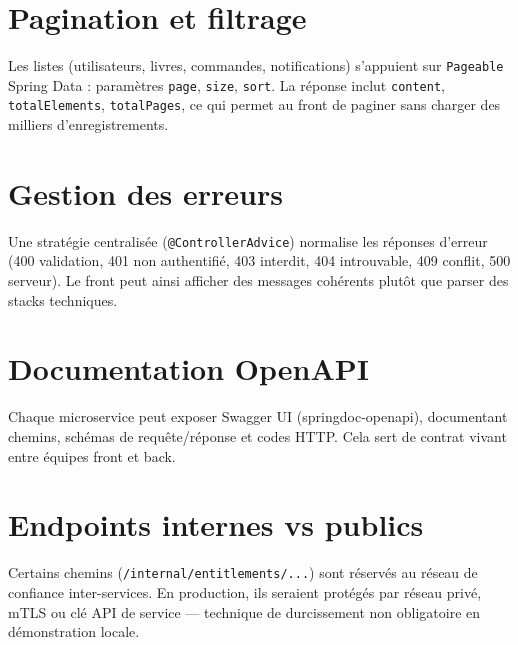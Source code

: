 \documentclass[12pt,a4paper]{report}
\begin{document}
\section{Pagination et filtrage}
Les listes (utilisateurs, livres, commandes, notifications) s'appuient sur \texttt{Pageable} Spring Data : paramètres \texttt{page}, \texttt{size}, \texttt{sort}. La réponse inclut \texttt{content}, \texttt{totalElements}, \texttt{totalPages}, ce qui permet au front de paginer sans charger des milliers d'enregistrements.\par

\section{Gestion des erreurs}
Une stratégie centralisée (\texttt{@ControllerAdvice}) normalise les réponses d'erreur (400 validation, 401 non authentifié, 403 interdit, 404 introuvable, 409 conflit, 500 serveur). Le front peut ainsi afficher des messages cohérents plutôt que parser des stacks techniques.\par

\section{Documentation OpenAPI}
Chaque microservice peut exposer Swagger UI (springdoc-openapi), documentant chemins, schémas de requête/réponse et codes HTTP. Cela sert de contrat vivant entre équipes front et back.\par

\section{Endpoints internes vs publics}
Certains chemins (\texttt{/internal/entitlements/...}) sont réservés au réseau de confiance inter-services. En production, ils seraient protégés par réseau privé, mTLS ou clé API de service — technique de durcissement non obligatoire en démonstration locale.\par
\end{document}
